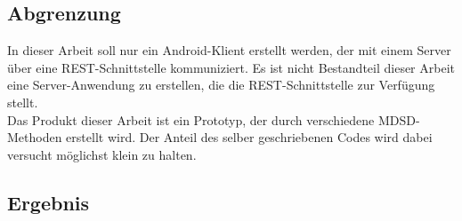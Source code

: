 	\subsection{Abgrenzung}
	In dieser Arbeit soll nur ein Android-Klient erstellt werden, der mit einem Server \"uber eine REST-Schnittstelle kommuniziert. Es ist nicht Bestandteil dieser Arbeit eine Server-Anwendung zu erstellen, die die REST-Schnittstelle zur Verf\"ugung stellt.\\
	Das Produkt dieser Arbeit ist ein Prototyp, der durch verschiedene MDSD-Methoden erstellt wird. Der Anteil des selber geschriebenen Codes wird dabei versucht m\"oglichst klein zu halten.
	
	\subsection{Ergebnis}